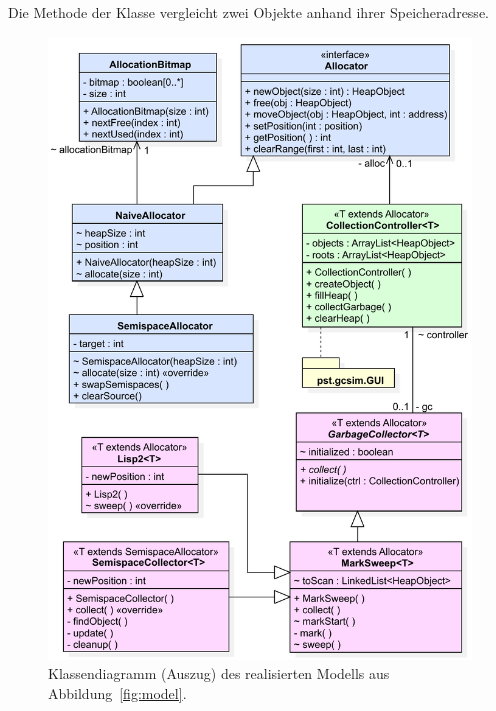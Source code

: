 \begin{listing}[h]
	\inputminted[]{java}{code/AddressComparator.java}
	\caption[Klasse  zum Vergleich von Objekten]{Die Methode  der Klasse  vergleicht zwei Objekte anhand ihrer Speicheradresse.}
	\label{java:comparator}
\end{listing}

\begin{figure}[t!]
	\centering
	\includegraphics[scale=0.6]{img/uml/ch7-klassen.pdf}
	\caption[Klassendiagramm des realisierten Modells (Auszug)]{Klassendiagramm (Auszug) des realisierten Modells aus Abbildung~\ref{fig:model}.}
	\label{fig:implementation}
\end{figure}


